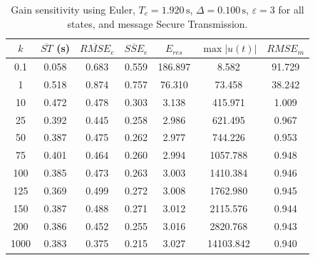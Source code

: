 \begin{table}[!t]
\centering
\caption{Gain sensitivity using Euler, $T_e=1.920\,\mathrm{s}$, $\Delta=0.100\,\mathrm{s}$, $\varepsilon=3$ for all states, and message Secure Transmission.}
\begin{tabular}{c|cccccc}
\hline
$k$ & $\overline{ST}$ (s) & $\overline{RMSE}_e$ & $\overline{SSE}_e$ & $E_{res}$ & $\max |u(t)|$ & $RMSE_m$ \\
\hline
0.1 & 0.058 & 0.683 & 0.559 & 186.897 & 8.582 & 91.729 \\
1 & 0.518 & 0.874 & 0.757 & 76.310 & 73.458 & 38.242 \\
10 & 0.472 & 0.478 & 0.303 & 3.138 & 415.971 & 1.009 \\
25 & 0.392 & 0.445 & 0.258 & 2.986 & 621.495 & 0.967 \\
50 & 0.387 & 0.475 & 0.262 & 2.977 & 744.226 & 0.953 \\
75 & 0.401 & 0.464 & 0.260 & 2.994 & 1057.788 & 0.948 \\
100 & 0.385 & 0.473 & 0.263 & 3.003 & 1410.384 & 0.946 \\
125 & 0.369 & 0.499 & 0.272 & 3.008 & 1762.980 & 0.945 \\
150 & 0.387 & 0.488 & 0.271 & 3.012 & 2115.576 & 0.944 \\
200 & 0.386 & 0.452 & 0.255 & 3.016 & 2820.768 & 0.943 \\
1000 & 0.383 & 0.375 & 0.215 & 3.027 & 14103.842 & 0.940 \\
\hline
\end{tabular}
\end{table}
